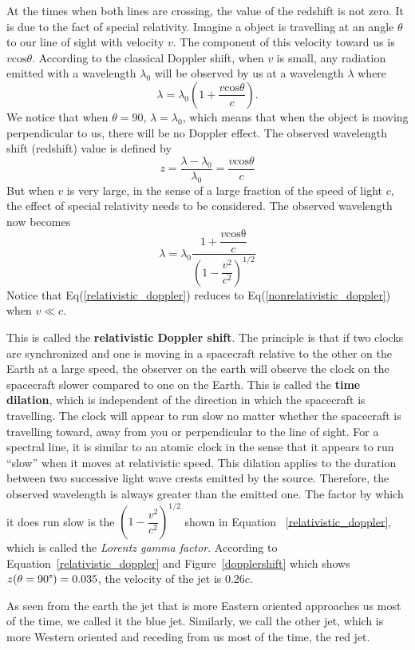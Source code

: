 At the times when both lines are crossing, the value of the redshift is not zero. It is due to the fact of special relativity. Imagine a object is travelling at an angle $\theta$ to our line of sight with velocity $v$. The component of this velocity toward us is $v\mathrm{cos}\theta$. According to the classical Doppler shift, when $v$ is small, any radiation emitted with a wavelength $\lambda_0$ will be observed by us at a wavelength $\lambda$ where
\begin{equation}
    \lambda = \lambda_0\left(1+\dfrac{v\mathrm{cos}\theta}{c}\right).
    \label{nonrelativistic_doppler}
\end{equation}
We notice that when $\theta = 90$, $\lambda = \lambda_0$, which means that when the object is moving perpendicular to us, there will be no Doppler effect. The observed wavelength shift (redshift) value is defined by 
\begin{equation}
    z = \dfrac{\lambda - \lambda_0}{\lambda_0} = \dfrac{v\mathrm{cos}\theta}{c}
\end{equation}
But when $v$ is very large, in the sense of a large fraction of the speed of light $c$, the effect of special relativity needs to be considered. The observed wavelength now becomes
\begin{equation}
    \lambda = \lambda_0 \dfrac{1 + \dfrac{v\mathrm{cos\theta}}{c}}{\left(1 - \dfrac{v^2}{c^2}\right)^{1/2}}
    \label{relativistic_doppler}
\end{equation}
Notice that Eq(\ref{relativistic_doppler}) reduces to Eq(\ref{nonrelativistic_doppler}) when $v \ll c$. \par 

This is called the \textbf{relativistic Doppler shift}. The principle is that if two clocks are synchronized and one is moving in a spacecraft relative to the other on the Earth at a large speed, the observer on the earth will observe the clock on the spacecraft slower compared to one on the Earth. This is called the \textbf{time dilation}, which is independent of the direction in which the spacecraft is travelling. The clock will appear to run slow no matter whether the spacecraft is travelling toward, away from you or perpendicular to the line of sight. For a spectral line, it is similar to an atomic clock in the sense that it appears to run ``slow'' when it moves at relativistic speed. This dilation applies to the duration between two successive light wave crests emitted by the source. Therefore, the observed wavelength is always greater than the emitted one. The factor by which it does run slow is the $\left(1 - \dfrac{v^2}{c^2}\right)^{1/2}$ shown in Equation ~\ref{relativistic_doppler}, which is called the \textit{Lorentz gamma factor}. According to Equation~\ref{relativistic_doppler} and Figure~\ref{dopplershift} which shows $z(\theta = 90\degree) = 0.035$, the velocity of the jet is 0.26$c$.\par
As seen from the earth the jet that is more Eastern oriented approaches us most of the time, we called it the blue jet. Similarly, we call the other jet, which is more Western oriented and receding from us most of the time, the red jet. 


